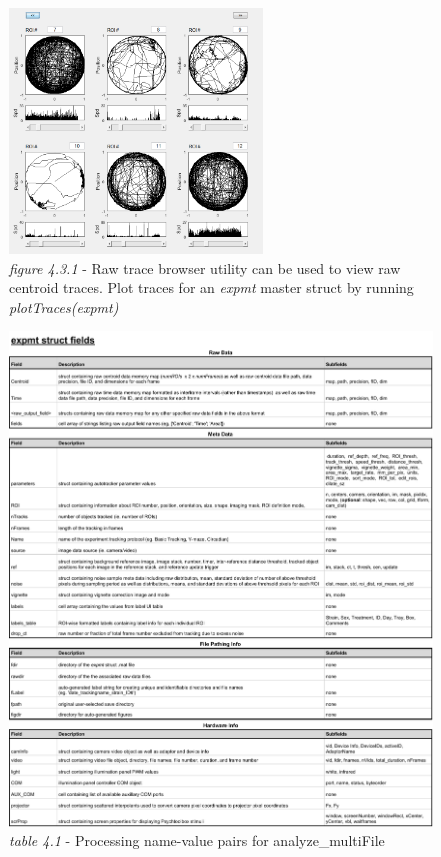 \documentclass[11pt]{article}
\begin{document}
\vspace*{0.75cm}
\begin{figure}[h!]
	\begin{center}
		\includegraphics[width=0.6\textwidth]{images/outputs/trace_browser.png}
		\caption*{\footnotesize {\textit{figure 4.3.1} - Raw trace browser utility can be used to view raw centroid traces. Plot traces for an \textit{expmt} master struct by running \textit{plotTraces(expmt)}}}
	\end{center}
\end{figure}

\newpage
\hypertarget{expmttable}{}
\begin{figure}[h!]
	\begin{center}
		\includegraphics[width=1\textwidth]{images/outputs/expmt_fields.pdf}
		\caption*{\footnotesize {\textit{table 4.1} - Processing name-value pairs for analyze\_multiFile}}
	\end{center}
\end{figure}
\end{document}

